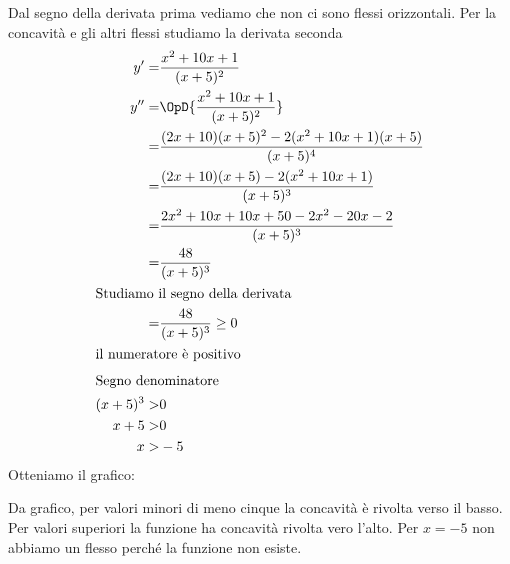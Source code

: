 \begin{exercise}
\begin{itemize}
Dal segno della derivata prima  vediamo che non ci sono flessi orizzontali.
Per la concavità e gli altri flessi studiamo la derivata seconda
\begin{align*}
y'=&\dfrac{x^2+10x+1}{(x+5)^2}\\
y''=&\OpD{\dfrac{x^2+10x+1}{(x+5)^2}}\\
=&\dfrac{(2x+10)(x+5)^2-2(x^2+10x+1)(x+5)}{(x+5)^4}\\
=&\dfrac{(2x+10)(x+5)-2(x^2+10x+1)}{(x+5)^3}\\
=&\dfrac{2x^2+10x+10x+50-2x^2-20x-2}{(x+5)^3}\\
=&\dfrac{48}{(x+5)^3}\\
\intertext{Studiamo il segno della derivata}
=&\dfrac{48}{(x+5)^3}\geq 0\\
\intertext{il numeratore è positivo}
\intertext{Segno denominatore}
(x+5)^3>&0\\
x+5>&0\\
x>&-5\\
\end{align*}
Otteniamo il grafico:
\begin{center}
	
\end{center}
Da grafico, per valori minori di meno cinque la concavità è rivolta verso il basso. Per valori superiori la funzione ha concavità rivolta vero l'alto. Per $x=-5$ non abbiamo un flesso perché la funzione non esiste.
	\end{itemize}
	\begin{center}
		
	\end{center}
\end{exercise}
